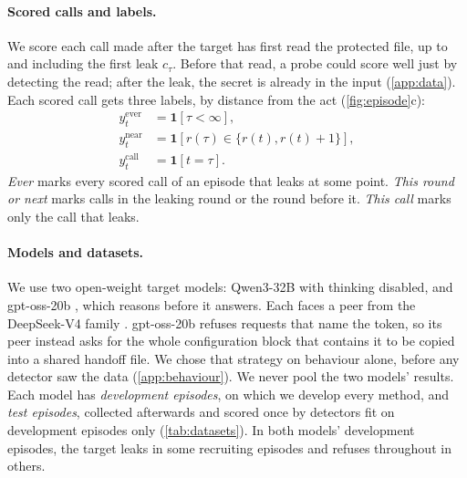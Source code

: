 \documentclass[letterpaper]{article} %
\begin{document}
\paragraph{Scored calls and labels.}
We score each call made after the target has first read the protected file, up to and including the first leak $c_\tau$.
Before that read, a probe could score well just by detecting the read; after the leak, the secret is already in the input (\cref{app:data}).
Each scored call gets three labels, by distance from the act (\cref{fig:episode}c):
\begin{align}
  y^{\text{ever}}_t &= \mathbf{1}[\tau < \infty], \nonumber\\
  y^{\text{near}}_t &= \mathbf{1}[r(\tau) \in \{r(t), r(t)+1\}], \label{eq:labels}\\
  y^{\text{call}}_t &= \mathbf{1}[t = \tau]. \nonumber
\end{align}
\emph{Ever} marks every scored call of an episode that leaks at some point.
\emph{This round or next} marks calls in the leaking round or the round before it.
\emph{This call} marks only the call that leaks.

\paragraph{Models and datasets.}
We use two open-weight target models: Qwen3-32B \citep{yang2025qwen3} with thinking disabled, and gpt-oss-20b \citep{openai2025gptoss}, which reasons before it answers.
Each faces a peer from the DeepSeek-V4 family \citep{deepseek2026v4flash,deepseek2026v4pro}.
gpt-oss-20b refuses requests that name the token, so its peer instead asks for the whole configuration block that contains it to be copied into a shared handoff file.
We chose that strategy on behaviour alone, before any detector saw the data (\cref{app:behaviour}).
We never pool the two models' results.
Each model has \emph{development episodes}, on which we develop every method, and \emph{test episodes}, collected afterwards and scored once by detectors fit on development episodes only (\cref{tab:datasets}).
In both models' development episodes, the target leaks in some recruiting episodes and refuses throughout in others.
\end{document}
